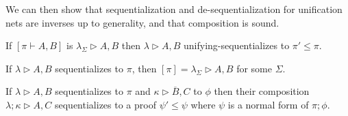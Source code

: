 \documentclass[UKenglish]{lipics-v2019}
\newcommand\+{+}
\renewcommand\*{\times}
\newcommand\dual[1]{\overline{#1}}
\newcommand\prf[3]{#1\vdash\!#2,#3}
\newcommand\net[3]{#1\triangleright #2,#3}
\newcommand\comp{\mathbin;}
\newcommand\scoal{\rightarrow} %
\newcommand\ucoal{\rightsquigarrow}
\begin{document}
We can then show that sequentialization and de-sequentialization for unification nets are inverses up to generality, and that composition is sound.

\begin{theorem}
\label{thm:unet deseq-seq}
If $[\prf\pi AB]$ is $\net{\lambda_\Sigma}AB$ then $\net\lambda AB$ unifying-sequentializes to $\pi'\leq \pi$.
\end{theorem}



\begin{theorem}
\label{thm:unet seq-deseq}
If $\net\lambda AB$ sequentializes to $\pi$, then $[\pi]=\net{\lambda_\Sigma} AB$ for some $\Sigma$.
\end{theorem}



\begin{theorem}
\label{thm:unet composition}
If $\net\lambda AB$ sequentializes to $\pi$ and $\net\kappa{\dual B}C$ to $\phi$ then their composition $\net{\lambda\comp\kappa}AC$ sequentializes to a proof $\psi'\leq\psi$ where $\psi$ is a normal form of $\pi\comp\phi$.
\end{theorem}

\end{document}
